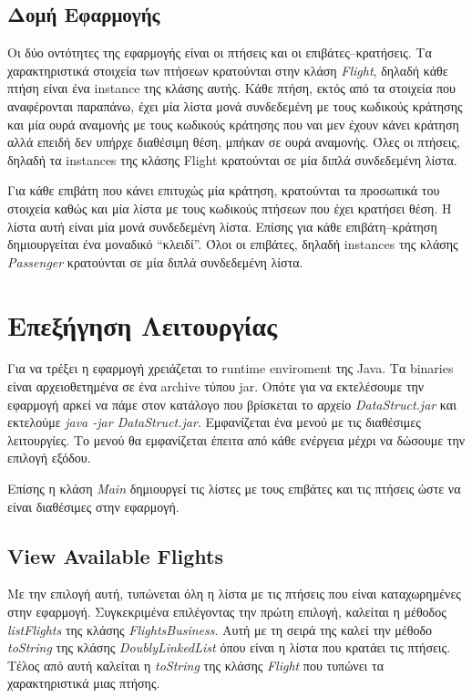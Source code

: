 \documentclass[a4paper]{article}
\begin{document}
\subsection{Δομή Εφαρμογής}
Οι δύο οντότητες της εφαρμογής είναι οι πτήσεις και οι επιβάτες--κρατήσεις. Τα
χαρακτηριστικά στοιχεία των πτήσεων κρατούνται στην κλάση \emph{Flight}, δηλαδή
κάθε πτήση είναι ένα instance της κλάσης αυτής. Κάθε πτήση, εκτός από τα
στοιχεία που αναφέρονται παραπάνω, έχει μία λίστα μονά συνδεδεμένη με τους
κωδικούς κράτησης και μία ουρά αναμονής με τους κωδικούς κράτησης που ναι μεν
έχουν κάνει κράτηση αλλά επειδή δεν υπήρχε διαθέσιμη θέση, μπήκαν σε ουρά
αναμονής. Όλες οι πτήσεις, δηλαδή τα instances της κλάσης Flight κρατούνται σε
μία διπλά συνδεδεμένη λίστα.

Για κάθε επιβάτη που κάνει επιτυχώς μία κράτηση, κρατούνται τα προσωπικά του
στοιχεία καθώς και μία λίστα με τους κωδικούς πτήσεων που έχει κρατήσει θέση. Η
λίστα αυτή είναι μία μονά συνδεδεμένη λίστα. Επίσης για κάθε επιβάτη--κράτηση
δημιουργείται ένα μοναδικό ``κλειδί''. Όλοι οι επιβάτες, δηλαδή instances της
κλάσης \emph{Passenger} κρατούνται σε μία διπλά συνδεδεμένη λίστα.

\section{Επεξήγηση Λειτουργίας}
Για να τρέξει η εφαρμογή χρειάζεται το runtime enviroment της Java. Τα binaries
είναι αρχειοθετημένα σε ένα archive τύπου jar. Οπότε για να εκτελέσουμε την
εφαρμογή αρκεί να πάμε στον κατάλογο που βρίσκεται το αρχείο
\emph{DataStruct.jar} και εκτελούμε \emph{java -jar DataStruct.jar}.
Εμφανίζεται ένα μενού με τις διαθέσιμες λειτουργίες. Το μενού θα εμφανίζεται
έπειτα από κάθε ενέργεια μέχρι να δώσουμε την επιλογή εξόδου.

Επίσης η κλάση \emph{Main} δημιουργεί τις λίστες με τους επιβάτες και τις
πτήσεις ώστε να είναι διαθέσιμες στην εφαρμογή.

\subsection{View Available Flights}
Με την επιλογή αυτή, τυπώνεται όλη η λίστα με τις πτήσεις που είναι
καταχωρημένες στην εφαρμογή. Συγκεκριμένα επιλέγοντας την πρώτη επιλογή,
καλείται η μέθοδος \emph{listFlights} της κλάσης \emph{FlightsBusiness}. Αυτή με
τη σειρά της καλεί την μέθοδο \emph{toString} της κλάσης \emph{DoublyLinkedList}
όπου είναι η λίστα που κρατάει τις πτήσεις. Τέλος από αυτή καλείται η
\emph{toString} της κλάσης \emph{Flight} που τυπώνει τα χαρακτηριστικά μιας
πτήσης.
\end{document}
